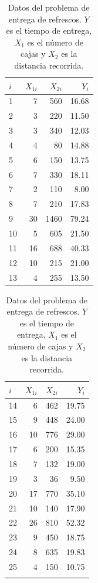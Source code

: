\documentclass[10.5pt,notitlepage]{article}
\theoremstyle{plain}
\begin{document}
 \begin{table}[htbp]
        \caption{Datos del problema de entrega de refrescos. $Y$ es el tiempo de  entrega, $X_1$ es el número de cajas y $X_2$ es la distancia recorrida.}
        \centering\begin{tabular}{@{}l@{\hskip 0.3in}r@{\hskip 0.3in}r@{\hskip 0.3in}r@{}}
            \toprule
            $i$ & $X_{1i}$ & $X_{2i}$ & $Y_i$ \\
            \midrule
            1 & 7 & 560 & 16.68 \\
            2 & 3 & 220 & 11.50 \\
            3 & 3 & 340 & 12.03 \\
            4 & 4 & 80 & 14.88 \\
            5 & 6 & 150 & 13.75 \\
            6 & 7 & 330 & 18.11 \\
            7 & 2 & 110 & 8.00 \\
            8 & 7 & 210 & 17.83 \\
            9 & 30 & 1460 & 79.24 \\
            10 & 5 & 605 & 21.50 \\
            11 & 16 & 688 & 40.33 \\
            12 & 10 & 215 & 21.00 \\
            13 & 4 & 255 & 13.50 \\
            \bottomrule
        \end{tabular}
        \qquad\qquad
        \begin{tabular}{@{}l@{\hskip 0.3in}r@{\hskip 0.3in}r@{\hskip 0.3in}r@{}}
            \toprule
            $i$ & $X_{1i}$ & $X_{2i}$ & $Y_i$ \\
            \midrule
            14 & 6 & 462 & 19.75 \\
            15 & 9 & 448 & 24.00 \\
            16 & 10 & 776 & 29.00 \\
            17 & 6 & 200 & 15.35 \\
            18 & 7 & 132 & 19.00 \\
            19 & 3 & 36 & 9.50 \\
            20 & 17 & 770 & 35.10 \\
            21 & 10 & 140 & 17.90 \\
            22 & 26 & 810 & 52.32 \\
            23 & 9 & 450 & 18.75 \\
            24 & 8 & 635 & 19.83 \\
            25 & 4 & 150 & 10.75 \\ \\
            \bottomrule
        \end{tabular}
        \label{tab 1}
    \end{table}
\end{document}
